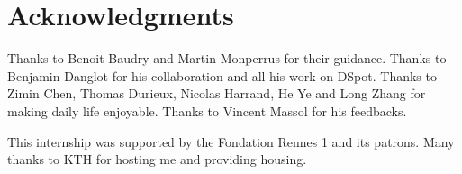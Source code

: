 \documentclass[a4paper,11pt]{sdm_internship}
\newcommand{\dspot}{DSpot\xspace}
\theoremstyle{definition}
\begin{document}
\section*{Acknowledgments}%
\label{sec:ack}%
Thanks to Benoit Baudry and Martin Monperrus for their guidance.
Thanks to Benjamin Danglot for his collaboration and all his work on \dspot.
Thanks to Zimin Chen, Thomas Durieux, Nicolas Harrand, He Ye and Long Zhang for making daily life enjoyable.
Thanks to Vincent Massol for his feedbacks.

This internship was supported by the Fondation Rennes 1 and its patrons.
Many thanks to KTH for hosting me and providing housing.


%

\end{document}
